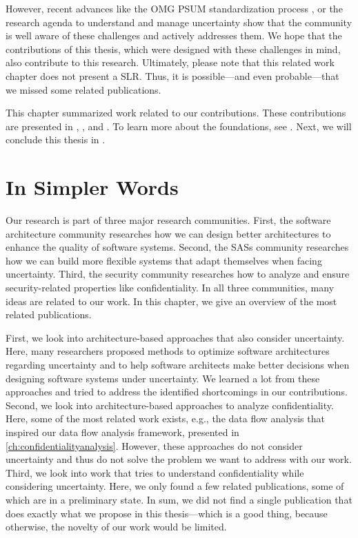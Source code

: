 However, recent advances like the \ac{OMG} \ac{PSUM} standardization process \cite{PSUM}, or the research agenda to understand and manage uncertainty \cite{weyns_towards_2023} show that the community is well aware of these challenges and actively addresses them.
We hope that the contributions of this thesis, which were designed with these challenges in mind, also contribute to this research.
Ultimately, please note that this related work chapter does not present a \ac{SLR}.
Thus, it is possible---and even probable---that we missed some related publications.

This chapter summarized work related to our contributions.
These contributions are presented in , , and .
To learn more about the foundations, see .
Next, we will conclude this thesis in .





\section{In Simpler Words}%
\label{sec:relatedwork:simple}

Our research is part of three major research communities.
First, the software architecture community researches how we can design better architectures to enhance the quality of software systems.
Second, the \acfp{SAS} community researches how we can build more flexible systems that adapt themselves when facing uncertainty.
Third, the security community researches how to analyze and ensure security-related properties like confidentiality.
In all three communities, many ideas are related to our work.
In this chapter, we give an overview of the most related publications.

First, we look into architecture-based approaches that also consider uncertainty.
Here, many researchers proposed methods to optimize software architectures regarding uncertainty and to help software architects make better decisions when designing software systems under uncertainty.
We learned a lot from these approaches and tried to address the identified shortcomings in our contributions.
Second, we look into architecture-based approaches to analyze confidentiality.
Here, some of the most related work exists, e.g., the data flow analysis that inspired our data flow analysis framework, presented in \autoref{ch:confidentialityanalysis}.
However, these approaches do not consider uncertainty and thus do not solve the problem we want to address with our work.
Third, we look into work that tries to understand confidentiality while considering uncertainty.
Here, we only found a few related publications, some of which are in a preliminary state.
In sum, we did not find a single publication that does exactly what we propose in this thesis---which is a good thing, because otherwise, the novelty of our work would be limited.

